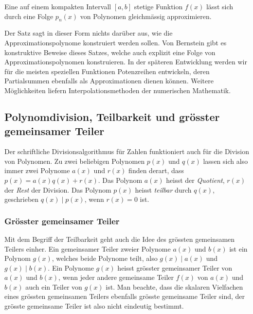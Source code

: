 \begin{satz}[Weierstrass]
\label{buch:potenzen:satz:weierstrass}
%
Eine auf einem kompakten Intervall $[a,b]$ stetige Funktion $f(x)$
lässt sich durch eine Folge $p_n(x)$ von Polynomen gleichmässig
approximieren.
\end{satz}

Der Satz sagt in dieser Form nichts darüber aus, wie die
Approximationspolynome konstruiert werden sollen.
Von Bernstein gibt es konstruktive Beweise dieses Satzes,
welche auch explizit eine Folge von Approximationspolynomen
konstruieren.
In der späteren Entwicklung werden wir für die meisten
speziellen Funktionen Potenzreihen entwickeln, deren Partialsummen
ebenfalls als Approximationen dienen können.
Weitere Möglichkeiten liefern Interpolationsmethoden der
numerischen Mathematik.

\subsection{Polynomdivision, Teilbarkeit und grösster gemeinsamer Teiler}
Der schriftliche Divisionsalgorithmus für Zahlen funktioniert 
auch für die Division von Polynomen.
Zu zwei beliebigen Polynomen $p(x)$ und $q(x)$ lassen sich also
immer zwei Polynome $a(x)$ und $r(x)$ finden derart, dass
$p(x) = a(x) q(x) + r(x)$.
Das Polynom $a(x)$ heisst der {\em Quotient}, $r(x)$ der {\em Rest}
der Division.
Das Polynom $p(x)$ heisst {\em teilbar} durch $q(x)$, geschrieben
$q(x)\mid p(x)$, wenn $r(x)=0$ ist.

\subsubsection{Grösster gemeinsamer Teiler}
Mit dem Begriff der Teilbarkeit geht auch die Idee des grössten
gemeinsamen Teilers einher.
Ein gemeinsamer Teiler zweier Polynome $a(x)$ und $b(x)$ 
ist ein Polynom $g(x)$, welches beide Polynome teilt, also
$g(x)\mid a(x)$ und $g(x)\mid b(x)$.
%
Ein Polynome $g(x)$ heisst grösster gemeinsamer Teiler von $a(x)$
und $b(x)$, wenn jeder andere gemeinsame Teiler $f(x)$ von $a(x)$
und $b(x)$ auch ein Teiler von $g(x)$ ist.
Man beachte, dass die skalaren Vielfachen eines grössten gemeinsamen
Teilers ebenfalls grösste gemeinsame Teiler sind, der grösste gemeinsame
Teiler ist also nicht eindeutig bestimmt.

